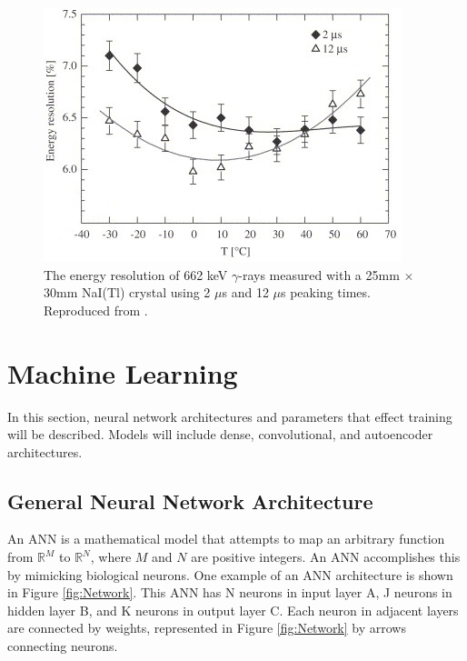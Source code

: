 \begin{figure}[H]
\centering
\includegraphics[width=0.95\linewidth]{images/temp-dependence-resolution-moszynski}
\caption{The energy resolution of 662 keV $\gamma$-rays measured with a 25mm × 30mm NaI(Tl) crystal using 2 $\mu$s and 12 $\mu$s peaking times. Reproduced from \cite{MOSZYNSKI2006739}.}


\label{fig:temp-dependence-resolution-moszynski}
\end{figure}

\section{Machine Learning}

In this section, neural network architectures and parameters that effect training will be described. Models will include dense, convolutional, and autoencoder architectures. 

\subsection{General Neural Network Architecture}

An ANN is a mathematical model that attempts to map an arbitrary function from $\mathbb{R}^M$ to $\mathbb{R}^N$, where $M$ and $N$ are positive integers. An ANN accomplishes this by mimicking biological neurons. One example of an ANN architecture is shown in Figure \ref{fig:Network}. This ANN has N neurons in input layer A, J neurons in hidden layer B, and K neurons in output layer C. Each neuron in adjacent layers are connected by weights, represented in Figure \ref{fig:Network} by arrows connecting neurons. 


